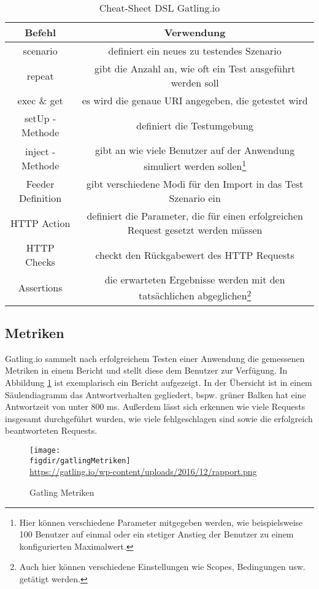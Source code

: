 \begin{table}[]
\centering
\caption{Cheat-Sheet DSL Gatling.io}
\label{table_cheatSheetDSL}
\begin{adjustbox}{max width=\textwidth}
\begin{tabular}{|c|c|}
\hline
\rowcolor[HTML]{FFCB2F} 
\textbf{Befehl} & \textbf{Verwendung} \\ \hline
scenario &  definiert ein neues zu testendes Szenario\\ \hline
repeat & gibt die Anzahl an, wie oft ein Test ausgeführt werden soll \\ \hline
exec \& get & es wird die genaue \ac{URI} angegeben, die getestet wird  \\ \hline
setUp - Methode & definiert die Testumgebung \\ \hline
inject - Methode & gibt an wie viele Benutzer auf der Anwendung simuliert werden sollen\footnote{{} Hier können verschiedene Parameter mitgegeben werden, wie beispielsweise 100 Benutzer auf einmal oder ein stetiger Anstieg der Benutzer zu einem konfigurierten Maximalwert.}  \\ \hline
Feeder Definition & gibt verschiedene Modi für den Import in das Test Szenario ein \\ \hline
HTTP Action & definiert die Parameter, die für einen erfolgreichen Request gesetzt werden müssen \\ \hline
HTTP Checks & checkt den Rückgabewert des HTTP Requests  \\ \hline
Assertions &  die erwarteten Ergebnisse werden mit den tatsächlichen abgeglichen\footnote{{} Auch hier können verschiedene Einstellungen wie Scopes, Bedingungen usw. getätigt werden. } \\ \hline


\end{tabular}
\end{adjustbox}
\end{table}

\subsection{Metriken}

Gatling.io sammelt nach erfolgreichem Testen einer Anwendung die gemessenen Metriken in einem Bericht und stellt diese dem Benutzer zur Verfügung. 
In Abbildung \ref{fig:gatlingMetriken} ist exemplarisch ein Bericht aufgezeigt. 
In der Übersicht ist in einem Säulendiagramm das Antwortverhalten gegliedert, bspw. grüner Balken hat eine Antwortzeit von unter 800 ms. 
Außerdem lässt sich erkennen wie viele Requests insgesamt durchgeführt wurden, wie viele fehlgeschlagen sind sowie die erfolgreich beantworteten Requests.
\begin{figure}
	{\caption{Gatling Metriken}
		\label{fig:gatlingMetriken}}
	{\texttt{[image: \\figdir/gatlingMetriken]}}\\
	\tiny{\quelle\url{https://gatling.io/wp-content/uploads/2016/12/rapport.png}}
\end{figure}



